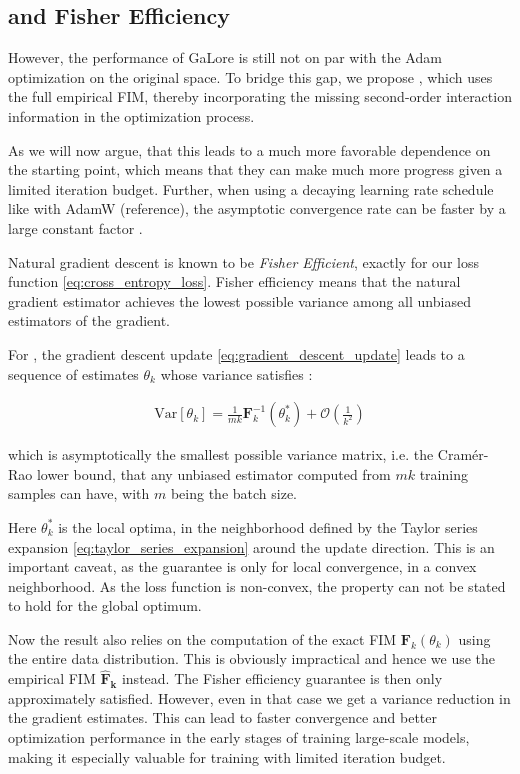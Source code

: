 \subsection{\lowrank and Fisher Efficiency}

However, the performance of GaLore is still not on par with the Adam optimization on the original space. To bridge this gap, we propose \lowrank, which uses the full empirical FIM, thereby incorporating the missing second-order interaction information in the optimization process.

As we will now argue, that this leads to a much more favorable dependence on the starting point, which means that they can make much more progress given a limited iteration budget. Further, when using a decaying learning rate schedule like with AdamW (reference), the asymptotic convergence rate can be faster by a large constant factor \citep{martens2020new}.

Natural gradient descent is known \citep{martens2020new} to be \textit{Fisher Efficient}, exactly for our loss function \ref{eq:cross_entropy_loss}. Fisher efficiency means that the natural gradient estimator achieves the lowest possible variance among all unbiased estimators of the gradient.

For \lowrank, the gradient descent update \ref{eq:gradient_descent_update} leads to a sequence of estimates \( \theta_{k} \) whose variance satisfies \citep{amariNaturalGradientWorks1998}:

\begin{eqnarray}
\text{Var}[\theta_{k}] = \frac{1}{mk} \mathbf{F}_{k}^{-1}(\theta_{k}^*) + \mathcal{O}\left(\frac{1}{k^2}\right)
\label{eq:variance_reduction}
\end{eqnarray}

which is asymptotically the smallest possible variance matrix, i.e. the Cramér-Rao lower bound, that any unbiased estimator computed from \(mk\) training samples can have, with \(m\) being the batch size.

Here \(\theta_{k}^*\) is the local optima, in the neighborhood defined by the Taylor series expansion \ref{eq:taylor_series_expansion} around the update direction. This is an important caveat, as the guarantee is only for local convergence, in a convex neighborhood. As the loss function is non-convex, the property can not be stated to hold for the global optimum.

Now the result also relies on the computation of the exact FIM \( \mathbf{F}_{k}(\theta_{k}) \) using the entire data distribution. This is obviously impractical and hence we use the empirical FIM \(\mathbf{\hat{F}_{k}}\) instead. The Fisher efficiency guarantee is then only approximately satisfied. However, even in that case we get a variance reduction in the gradient estimates. This can lead to faster convergence and better optimization performance in the early stages of training large-scale models, making it especially valuable for training with limited iteration budget.

